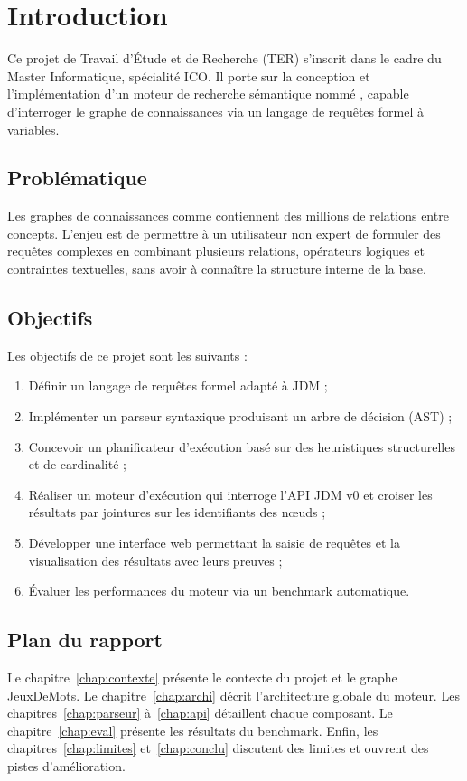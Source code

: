 \chapter{Introduction}
\label{chap:intro}

Ce projet de Travail d'Étude et de Recherche (TER) s'inscrit dans le cadre du Master Informatique, spécialité ICO. Il porte sur la conception et l'implémentation d'un moteur de recherche sémantique nommé \wido{}, capable d'interroger le graphe de connaissances \jdm{} via un langage de requêtes formel à variables.

\section{Problématique}

Les graphes de connaissances comme \jdm{} contiennent des millions de relations entre concepts. L'enjeu est de permettre à un utilisateur non expert de formuler des requêtes complexes en combinant plusieurs relations, opérateurs logiques et contraintes textuelles, sans avoir à connaître la structure interne de la base.

\section{Objectifs}

Les objectifs de ce projet sont les suivants :
\begin{enumerate}
    \item Définir un langage de requêtes formel adapté à JDM ;
    \item Implémenter un parseur syntaxique produisant un arbre de décision (AST) ;
    \item Concevoir un planificateur d'exécution basé sur des heuristiques structurelles et de cardinalité ;
    \item Réaliser un moteur d'exécution qui interroge l'API JDM v0 et croiser les résultats par jointures sur les identifiants des nœuds ;
    \item Développer une interface web permettant la saisie de requêtes et la visualisation des résultats avec leurs preuves ;
    \item Évaluer les performances du moteur via un benchmark automatique.
\end{enumerate}

\section{Plan du rapport}

Le chapitre~\ref{chap:contexte} présente le contexte du projet et le graphe JeuxDeMots. Le chapitre~\ref{chap:archi} décrit l'architecture globale du moteur. Les chapitres~\ref{chap:parseur} à~\ref{chap:api} détaillent chaque composant. Le chapitre~\ref{chap:eval} présente les résultats du benchmark. Enfin, les chapitres~\ref{chap:limites} et~\ref{chap:conclu} discutent des limites et ouvrent des pistes d'amélioration.
